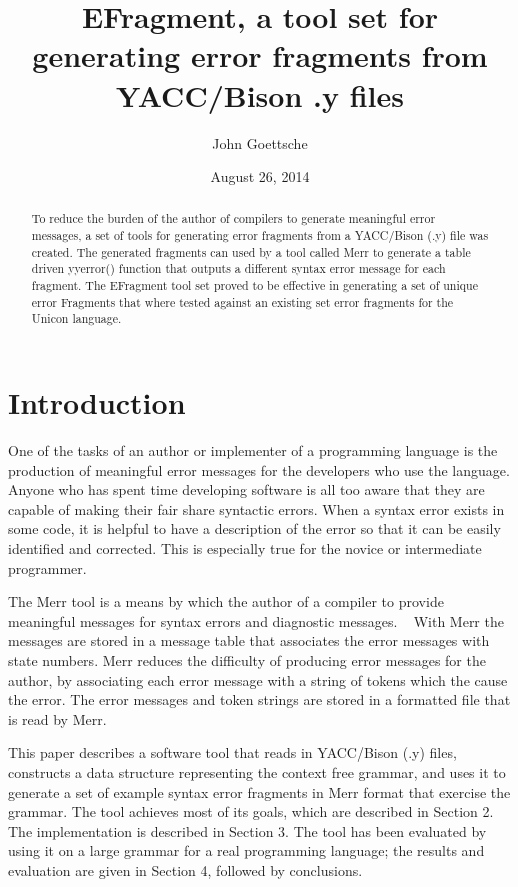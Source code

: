 \documentclass{article}
\begin{document}
\title{EFragment, a tool set for generating error fragments from YACC/Bison .y files}
\author{John Goettsche}
\date{August 26, 2014}

\maketitle
\begin{abstract}
To reduce the burden of the author of compilers to generate meaningful error messages, a set of tools for generating error fragments from a YACC/Bison (.y) file was created.  The generated fragments can used by a tool called Merr to generate a table driven yyerror() function that outputs a different syntax error message for each fragment.  The EFragment tool set proved to be effective in generating a set of unique error Fragments that where tested against an existing set error fragments for the Unicon language. 
\end{abstract}

\section{Introduction}
One of the tasks of an author or implementer of a programming language is the production of meaningful error messages for the developers who use the language.  Anyone who has spent time developing software is all too aware that they are capable of making their fair share syntactic errors.  When a syntax error exists in some code, it is helpful to have a description of the error so that it can be easily identified and corrected.  This is especially true for the novice or intermediate programmer.

The Merr tool is a means by which the author of a compiler to provide meaningful messages for syntax errors and diagnostic messages. ~\cite{jeffery} With Merr the messages are stored in a message table that associates the error messages with state numbers.  Merr reduces the difficulty of producing error messages for the author, by associating each error message with a string of tokens which the cause the error.  The error messages and token strings are stored in a formatted file that is read by Merr. 

This paper describes a software tool that reads in YACC/Bison (.y) files, constructs a data structure representing the context free grammar, and uses it to generate a set of example syntax error fragments in Merr format that exercise the grammar.  The tool achieves most of its goals, which are described in Section 2.  The implementation is described in Section 3.  The tool has been evaluated by using it on a large grammar for a real programming language; the results and evaluation are given in Section 4, followed by conclusions.
\end{document}
